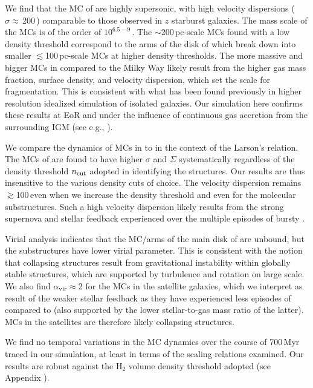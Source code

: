 \IfFileExists{emulateapjlegacy.cls}{\documentclass[iop]{emulateapjlegacy}}{\documentclass[iop]{emulateapj}}
\begin{document}
We find that the MC of \flower are highly supersonic, with high velocity dispersions ($\sigma\approx$\,200\,\kms) comparable to
those observed in $z$ starburst galaxies.
The mass scale of the MCs is of the order of $10^{6.5-9}$\,\Msun. The $\sim$200\,pc-scale MCs found with a low density threshold
correspond to the arms of the disk of \flower which break down into smaller $\lesssim$100\,pc-scale MCs at higher density thresholds.
The more massive and bigger MCs in \flower compared to the Milky Way
likely result from the higher gas mass fraction, surface density, and velocity dispersion,
which set the scale for fragmentation.
This is consistent with what has been found previously in higher resolution idealized simulation of isolated galaxies.
Our simulation here confirms these results at EoR and under
the influence of continuous gas accretion from the surrounding IGM (see e.g., \citealt{Klessen10a, Goldbaum11a}).

We compare the dynamics of MCs in \flower to \obs in the context of the Larson's relation.
The MCs of \flower are found to have higher $\sigma$ and $\Sigma$ systematically regardless of the 
density threshold $n_{\rm cut}$ adopted in identifying the structures.
Our results are thus insensitive to the various density cuts of choice.
The velocity dispersion remains $\gtrsim$100\,\kms even when we increase the 
density threshold and even for the molecular substructures.
Such a high velocity dispersion likely results from
the strong supernova and stellar feedback \flower experienced over the multiple episodes of bursty \SF.

Virial analysis indicates that the MC/arms of the main disk of \flower are unbound, but the substructures have lower virial parameter.
This is consistent with the notion that collapsing structures result from gravitational instability within globally stable structures, which are
supported by turbulence and rotation on large scale.
We also find $\alpha_{\rm vir}\approx$\,2 for the MCs in the satellite galaxies, which we interpret as
result of the weaker stellar feedback as they have
experienced less episodes of \SF compared to \flower (also supported by the lower stellar-to-gas mass ratio of the latter).
MCs in the satellites are therefore likely collapsing structures.

We find no temporal variations in the MC dynamics over the course of 700\,Myr traced in our simulation, 
at least in terms of the scaling relations examined.
Our results are robust against the H$_2$ volume density threshold adopted (see Appendix ).
\end{document}
